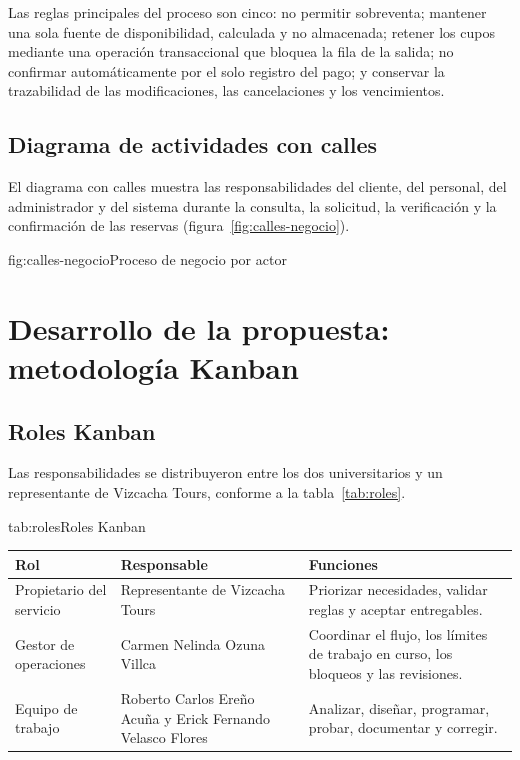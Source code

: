 Las reglas principales del proceso son cinco: no permitir sobreventa;
mantener una sola fuente de disponibilidad, calculada y no almacenada;
retener los cupos mediante una operación transaccional que bloquea la fila de
la salida; no confirmar automáticamente por el solo registro del pago; y
conservar la trazabilidad de las modificaciones, las cancelaciones y los
vencimientos.

\subsection{Diagrama de actividades con calles}

El diagrama con calles muestra las responsabilidades del cliente, del
personal, del administrador y del sistema durante la consulta, la solicitud,
la verificación y la confirmación de las reservas
(figura~\ref{fig:calles-negocio}).

\begin{figuraapa}{fig:calles-negocio}{Proceso de negocio por actor}
\end{figuraapa}

\section{Desarrollo de la propuesta: metodología Kanban}

\subsection{Roles Kanban}

Las responsabilidades se distribuyeron entre los dos universitarios y un
representante de Vizcacha Tours, conforme a la tabla~\ref{tab:roles}.

\begin{tablaapa}{tab:roles}{Roles Kanban}
\small
\begin{tabular}{@{}p{3.4cm}p{4.6cm}p{6.6cm}@{}}
\toprule
Rol & Responsable & Funciones \\
\midrule
Propietario del servicio & Representante de Vizcacha Tours &
Priorizar necesidades, validar reglas y aceptar entregables. \\
Gestor de operaciones & Carmen Nelinda Ozuna Villca &
Coordinar el flujo, los límites de trabajo en curso, los bloqueos y las
revisiones. \\
Equipo de trabajo & Roberto Carlos Ereño Acuña y Erick Fernando Velasco
Flores & Analizar, diseñar, programar, probar, documentar y corregir. \\
\bottomrule
\end{tabular}
\end{tablaapa}

